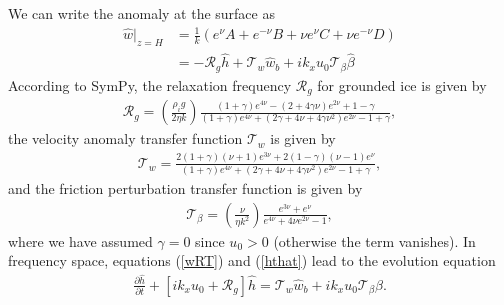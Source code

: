 \documentclass[paper=a4, fontsize=11pt]{article}
\begin{document}
We can write the anomaly at the surface as
\begin{align}
\widehat{w}|_{z=H} &= \frac{1}{k}\left(e^{\nu} A + { e^{-\nu}}B + \nu e^{\nu} C + {\nu}{ e^{-\nu}} D\right) \\
&= -\mathcal{R}_g\widehat{h} + \mathcal{T}_w\widehat{w}_b  +ik_x u_0  \mathcal{T}_{\beta}  \widehat{\beta}\label{wRT}
\end{align}
According to SymPy, the relaxation frequency $\mathcal{R}_g$ for grounded ice is given by
\begin{align}
\mathcal{R}_g = \left(\frac{\rho_i g }{2\eta k}\right)\frac{ (1+\gamma)e^{4\nu} -(2+4\gamma\nu)e^{2\nu} +1-\gamma  }{ (1+\gamma)e^{4\nu} + (2\gamma+4\nu+4\gamma\nu^2)e^{2\nu} -1 + \gamma  },
\end{align}
the velocity anomaly transfer function $\mathcal{T}_w$ is given by
\begin{align}
\mathcal{T}_w = \frac{2(1+\gamma)(\nu+1)e^{3\nu}+2(1-\gamma)(\nu-1)e^{\nu}  }{(1+\gamma)e^{4\nu} + (2\gamma+4\nu+4\gamma\nu^2)e^{2\nu} -1 + \gamma },
\end{align}
and the friction perturbation transfer function is given by
\begin{align}
\mathcal{T}_{\beta} =  \left(\frac{\nu}{\eta k^2}\right) \frac{e^{3\nu} + e^{\nu}}{e^{4\nu} +4\nu e^{2\nu} -1 },
\end{align}
where we have assumed $\gamma=0$  since $u_0>0$ (otherwise the term vanishes).
In frequency space,
equations (\ref{wRT}) and (\ref{hthat}) lead to the evolution equation
\begin{align}
\frac{\partial \widehat{h}}{\partial t}+ \left[ik_xu_0  + \mathcal{R}_g\right]\widehat{h} = \mathcal{T}_w\widehat{w}_b+ik_xu_0\mathcal{T}_{\beta} \widehat{\beta}. \label{dhhat}
\end{align}
\end{document}
